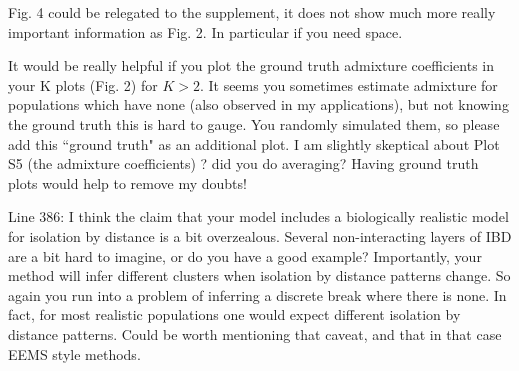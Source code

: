 \begin{point}{}
    Fig. 4 could be relegated to the supplement, it does not show much more really important information as Fig. 2. 
 In particular if you need space.
\end{point}


\begin{point}{}
    It would be really helpful if you plot the ground truth admixture coefficients in your K plots (Fig. 2) for $K>2$. 
 It seems you sometimes estimate admixture for populations which have none (also observed in my applications), 
 but not knowing the ground truth this is hard to gauge. 
 You randomly simulated them, so please add this ``ground truth" as an additional plot. 
 I am slightly skeptical about Plot S5 (the admixture coefficients) ? did you do averaging? 
 Having ground truth plots would help to remove my doubts!
\end{point}


\begin{point}{}
    Line 386: I think the claim that your model includes a biologically realistic model for isolation by distance is a bit overzealous. 
 Several non-interacting layers of IBD are a bit hard to imagine, 
 or do you have a good example?
 Importantly, your method will infer different clusters when isolation by distance patterns change. 
 So again you run into a problem of inferring a discrete break where there is none. 
 In fact, for most realistic populations one would expect different isolation by distance patterns.
  Could be worth mentioning that caveat, and that in that case EEMS style methods.
\end{point}

